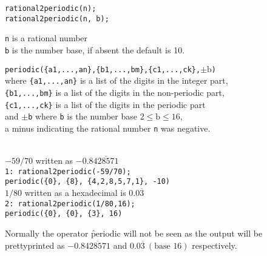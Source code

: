 \begin{description}[style=nextline]
\item[\textbf{SYNTAX:}]%
  \texttt{rational2periodic(n);}\\
  \texttt{rational2periodic(n, b);}

\item[\textbf{INPUT:}]
  \texttt{n} \hspace{3mm} is a rational number\\
  \texttt{b} \hspace{3mm} is the number base, if absent the default is 10.

\item[\textbf{RESULT:}]
  \texttt{periodic(\{a1,...,an\},\{b1,...,bm\},\{c1,...,ck\},$\pm{\mathrm{b}}$)}\\
  where  \texttt{\{a1,...,an\}} is a list of the digits in the integer part,\\
  \texttt{\{b1,...,bm\}} is a list of the digits in the non-periodic part,\\
  \texttt{\{c1,...,ck\}} is a list of the digits in the periodic part\\
  and $\pm$\texttt{b} where \texttt{b} is the number base $2 \leq \mathrm{b} \leq 16$, \\
  a minus indicating the rational number \texttt{n} was negative.

\item[\textbf{EXAMPLES:}]\mbox{}\\
  $-59/70$ written as $-0.8\overline{428571}$\\
  \texttt{1: rational2periodic(-59/70);}\\
  \texttt{\hspace*{1em}periodic(\{0\}, \{8\}, \{4,2,8,5,7,1\}, -10)}\\[\baselineskip]
  $1/80$ written as a hexadecimal is $0.0\overline{3}$\\
  \texttt{2: rational2periodic(1/80,16);}\\
  \texttt{\hspace*{1em}periodic(\{0\}, \{0\}, \{3\}, 16)}
\end{description}

Normally the operator \f{periodic} will not be seen as the output
will be prettyprinted as $-0.8\overline{428571}$ and
$0.0\overline{3}\ (\mbox{base }16)$ respectively.

